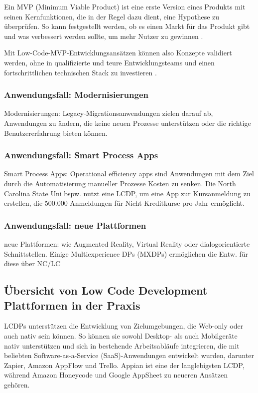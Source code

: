 \documentclass[12pt]{article} %
\begin{document}
	Ein MVP (Minimum Viable Product) ist eine erste Version eines Produkts mit seinen Kernfunktionen, die in der Regel dazu dient, eine Hypothese zu überprüfen. So kann festgestellt werden, ob es einen Markt für das Produkt gibt und was verbessert werden sollte, um mehr Nutzer zu gewinnen \cite{OleksiiGlib.2022}.
		
	Mit Low-Code-MVP-Entwicklungsansätzen können also Konzepte validiert werden, ohne in qualifizierte und teure Entwicklungsteams und einen fortschrittlichen technischen Stack zu investieren \cite{OleksiiGlib.2022}.
	
	\subsubsection{Anwendungsfall: Modernisierungen}
	Modernisierungen: Legacy-Migrationsanwendungen zielen darauf ab, Anwendungen zu ändern, die keine neuen Prozesse unterstützen oder die richtige Benutzererfahrung bieten können.
	
	\subsubsection{Anwendungsfall: Smart Process Apps}
	Smart Process Apps: Operational efficiency apps sind Anwendungen mit dem Ziel durch die Automatisierung manueller Prozesse Kosten zu senken. Die North Carolina State Uni bspw. nutzt eine LCDP, um eine App zur Kursanmeldung zu erstellen, die 500.000 Anmeldungen für Nicht-Kreditkurse pro Jahr ermöglicht.
	
	\subsubsection{Anwendungsfall: neue Plattformen}
	neue Plattformen: wie Augmented Reality, Virtual Reality oder dialogorientierte Schnittstellen. Einige Multiexperience DPs (MXDPs) ermöglichen die Entw. für diese über NC/LC 
	
	
	\subsection{Übersicht von Low Code Development Plattformen in der Praxis}	
	
	LCDPs unterstützen die Entwicklung von Zielumgebungen, die Web-only oder auch nativ sein können. So können sie sowohl Desktop- als auch Mobilgeräte nativ unterstützen und sich in bestehende Arbeitsabläufe integrieren, die mit beliebten Software-as-a-Service (SaaS)-Anwendungen entwickelt wurden, darunter Zapier, Amazon AppFlow und Trello. Appian ist eine der langlebigsten LCDP, während Amazon Honeycode und Google AppSheet zu neueren Ansätzen gehören. \cite{DiRuscio.2022}
	
\end{document}
